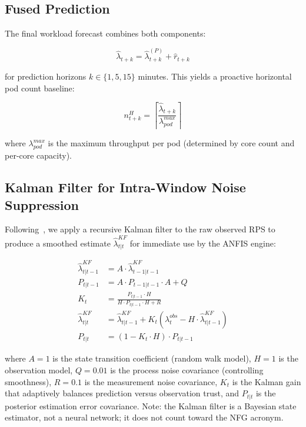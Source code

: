 \documentclass[conference]{IEEEtran}
\begin{document}
\subsection{Fused Prediction}

The final workload forecast combines both components:

\begin{equation}
\label{eq:fused}
\hat{\lambda}_{t+k} = \hat{\lambda}^{(P)}_{t+k} + \hat{r}_{t+k}
\end{equation}

\noindent for prediction horizons $k \in \{1, 5, 15\}$ minutes. This yields a proactive horizontal pod count baseline:

\begin{equation}
\label{eq:pod_count}
n^{H}_{t+k} = \left\lceil \frac{\hat{\lambda}_{t+k}}{\lambda_{pod}^{max}} \right\rceil
\end{equation}

\noindent where $\lambda_{pod}^{max}$ is the maximum throughput per pod (determined by core count and per-core capacity).

\subsection{Kalman Filter for Intra-Window Noise Suppression}

Following~\cite{gu2025hasgpu}, we apply a recursive Kalman filter to the raw observed RPS to produce a smoothed estimate $\hat{\lambda}^{KF}_{t|t}$ for immediate use by the ANFIS engine:

\begin{align}
\hat{\lambda}^{KF}_{t|t-1} &= A \cdot \hat{\lambda}^{KF}_{t-1|t-1} \label{eq:kf_predict}\\
P_{t|t-1} &= A \cdot P_{t-1|t-1} \cdot A + Q \label{eq:kf_cov_predict}\\
K_t &= \frac{P_{t|t-1} \cdot H}{H \cdot P_{t|t-1} \cdot H + R} \label{eq:kalman_gain}\\
\hat{\lambda}^{KF}_{t|t} &= \hat{\lambda}^{KF}_{t|t-1} + K_t \!\left(\lambda^{obs}_t - H \cdot \hat{\lambda}^{KF}_{t|t-1}\right) \label{eq:kf_update}\\
P_{t|t} &= (1 - K_t \cdot H) \cdot P_{t|t-1} \label{eq:kf_cov_update}
\end{align}

\noindent where $A=1$ is the state transition coefficient (random walk model), $H=1$ is the observation model, $Q=0.01$ is the process noise covariance (controlling smoothness), $R=0.1$ is the measurement noise covariance, $K_t$ is the Kalman gain that adaptively balances prediction versus observation trust, and $P_{t|t}$ is the posterior estimation error covariance. Note: the Kalman filter is a Bayesian state estimator, not a neural network; it does not count toward the NFG acronym.
\end{document}
